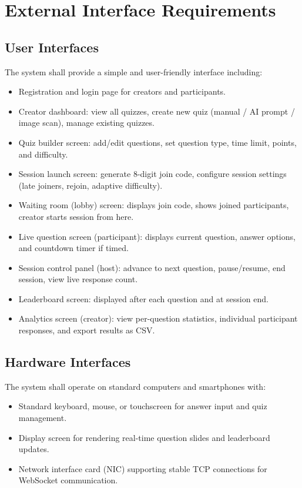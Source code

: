 \documentclass[12pt,a4paper]{article}
\begin{document}
\section{External Interface Requirements}

\subsection{User Interfaces}
The system shall provide a simple and user-friendly interface including:
\begin{itemize}
  \item Registration and login page for creators and participants.
  \item Creator dashboard: view all quizzes, create new quiz (manual / AI prompt /
        image scan), manage existing quizzes.
  \item Quiz builder screen: add/edit questions, set question type, time limit,
        points, and difficulty.
  \item Session launch screen: generate 8-digit join code, configure session
        settings (late joiners, rejoin, adaptive difficulty).
  \item Waiting room (lobby) screen: displays join code, shows joined participants,
        creator starts session from here.
  \item Live question screen (participant): displays current question, answer
        options, and countdown timer if timed.
  \item Session control panel (host): advance to next question, pause/resume, end
        session, view live response count.
  \item Leaderboard screen: displayed after each question and at session end.
  \item Analytics screen (creator): view per-question statistics, individual
        participant responses, and export results as CSV.
\end{itemize}

\subsection{Hardware Interfaces}
The system shall operate on standard computers and smartphones with:
\begin{itemize}
  \item Standard keyboard, mouse, or touchscreen for answer input and quiz management.
  \item Display screen for rendering real-time question slides and leaderboard updates.
  \item Network interface card (NIC) supporting stable TCP connections for WebSocket
        communication.
\end{itemize}
\end{document}
